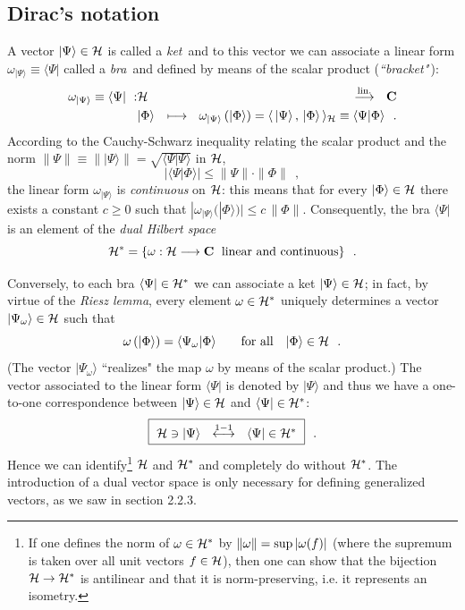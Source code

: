 \documentclass[a4wide,12pt]{report}
\begin{document}
\subsection{Dirac's notation}

A vector $|\Psi \rangle \in {\cal H}$ is called a {\em ket}$\,$
and to this vector we can associate a linear form 
$\omega_{|\Psi \rangle} \equiv \langle \Psi |$
called a {\em bra}$\,$ and defined by means of the scalar product
($\!${\em ``bracket"}$\,$):
\begin{eqnarray}
\label{bra}
\omega_{|\Psi \rangle} \equiv \langle \Psi |
\ : & {\cal H} & \stackrel{{\rm lin.}}{\longrightarrow} \ \ {\bf C}
\\
 & |\Phi \rangle & \longmapsto \ \
\omega_{|\Psi \rangle} \left( | \Phi \rangle \right)
= \langle \,
|\Psi \rangle \, , \,   | \Phi \rangle \, \rangle  _{{\cal H}} \equiv
\langle \Psi | \Phi \rangle
\ \ .
\nonumber
\end{eqnarray}
According to the Cauchy-Schwarz inequality relating 
the scalar product 
and the norm 
$\|  \Psi  \| \equiv \| |  \Psi  \rangle \| =
\sqrt{\langle \Psi | \Psi \rangle}$
in ${\cal H}$,
\[
| \langle \Psi | \Phi \rangle | \leq
\| \Psi \|   \cdot
\| \Phi  \|
\ \ ,
\]
the linear form 
$\omega_{|\Psi \rangle}$ is {\em continuous} on ${\cal H}$: 
this means that for every 
$|\Phi \rangle \in {\cal H}$ 
there exists a constant 
$c\geq 0$ 
such that 
$| \omega_{| \Psi \rangle} (| \Phi \rangle ) | \leq
c  \, \| \Phi \|$. 
Consequently, the bra 
$\langle \Psi |$ is an element of the {\em dual Hilbert space} 
\[
{\cal H}^{\ast} = \{ \omega : {\cal H}
\longrightarrow {\bf C} \ \; \mbox{linear and continuous} \}
\ \ .
\]
 
Conversely, to each bra $\langle \Psi | \in {\cal H}^{\ast}$
we can associate a ket $| \Psi \rangle \in {\cal H}$;
in fact, by virtue of the {\em Riesz lemma},
every element  $\omega \in {\cal H}^{\ast}$ 
uniquely determines a vector $| \Psi _{\omega} \rangle
\in {\cal H}$ such that 
\[
\omega \left( | \Phi \rangle \right)
= \langle \Psi_{\omega} | \Phi \rangle
\qquad \mbox{for all} \quad | \Phi \rangle \in {\cal H}
\ \ .
\]
(The vector 
$| \Psi _{\omega} \rangle$ ``realizes" the map $\omega$
by means of the scalar product.)  
The vector associated to the linear form $\langle \Psi |$
is denoted by $| \Psi \rangle$ and thus we have a 
one-to-one correspondence between $| \Psi \rangle \in {\cal H}$
and $\langle \Psi | \in {\cal H}^{\ast}$:
\begin{equation}
\fbox{\mbox{$ \ {\cal H} \ni
| \Psi \rangle \ \ \stackrel{{\rm 1-1}}{\longleftrightarrow}
\ \ \langle \Psi | \in {\cal H}^{\ast} \ $}}
\ \ .
\end{equation}
Hence we can identify\footnote{If one defines the norm of  
$\omega \in {\cal H}^{\ast}$ by $\| \omega \| =
{\rm sup} \, | \omega (f) |$ (where the supremum is taken 
 over all unit vectors $f \in {\cal H}$), then one can show that the 
bijection ${\cal H} \to {\cal H}^{\ast}$ is antilinear and that it is 
norm-preserving, i.e. it represents an isometry.} ${\cal H}$ and ${\cal H}^{\ast}$    
and completely do without ${\cal H}^{\ast}$. 
The introduction of a dual vector space is only necessary for defining 
generalized vectors, as we saw in section 2.2.3. 
\end{document}
